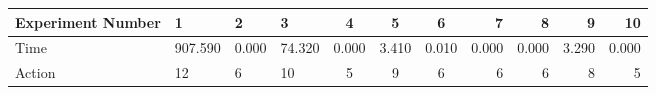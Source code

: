 \documentclass[8pt]{article}
\begin{document}
\begin{landscape}
\begin{tabular}{ | l | l | l | l | c | c | c | r | r | r | r | }
 \hline 
Experiment Number & 1 & 2 & 3 & 4 & 5 & 6 & 7 & 8 & 9 & 10\\ \hline
Time & 907.590 & 0.000 & 74.320 & 0.000 & 3.410 & 0.010 & 0.000 & 0.000 & 3.290 & 0.000\\ \hline
Action & 12 & 6 & 10 & 5 & 9 & 6 & 6 & 6 & 8 & 5\\ \hline\end{tabular}
\end{landscape}
\end{document}
